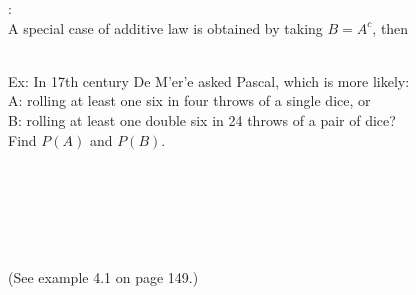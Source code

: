 \textbf{\underbar{~~~~~~~~~~~~~~~~~~~~~~~~~~~~~~~~~~~~~~~~~~~~~}}:\\
A special case of additive law is obtained by taking $B = A^{c}$, then
\begin{center}
\end{center}
~\\
Ex: In 17th century De M'er'e asked Pascal, which is more likely:\\
\indent A: rolling at least one six in four throws of a single dice, or\\
\indent B: rolling at least one double six in 24 throws of a pair of dice?\\
Find $P(A)$ and $P(B)$.\\~\\~\\~\\~\\~\\~\\


(See example 4.1 on page 149.)
	
